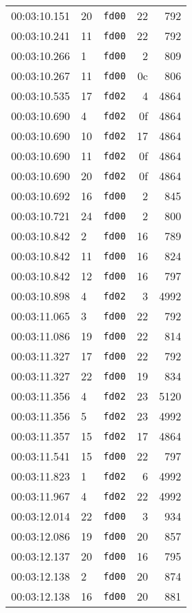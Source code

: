 \documentclass{article}
\begin{document}
\begin{longtable}{lllrr}
00:03:10.151 & 20 & \texttt{fd00} & 22 & 792 \\
00:03:10.241 & 11 & \texttt{fd00} & 22 & 792 \\
00:03:10.266 & 1 & \texttt{fd00} & 2 & 809 \\
00:03:10.267 & 11 & \texttt{fd00} & 0c & 806 \\
00:03:10.535 & 17 & \texttt{fd02} & 4 & 4864 \\
00:03:10.690 & 4 & \texttt{fd02} & 0f & 4864 \\
00:03:10.690 & 10 & \texttt{fd02} & 17 & 4864 \\
00:03:10.690 & 11 & \texttt{fd02} & 0f & 4864 \\
00:03:10.690 & 20 & \texttt{fd02} & 0f & 4864 \\
00:03:10.692 & 16 & \texttt{fd00} & 2 & 845 \\
00:03:10.721 & 24 & \texttt{fd00} & 2 & 800 \\
00:03:10.842 & 2 & \texttt{fd00} & 16 & 789 \\
00:03:10.842 & 11 & \texttt{fd00} & 16 & 824 \\
00:03:10.842 & 12 & \texttt{fd00} & 16 & 797 \\
00:03:10.898 & 4 & \texttt{fd02} & 3 & 4992 \\
00:03:11.065 & 3 & \texttt{fd00} & 22 & 792 \\
00:03:11.086 & 19 & \texttt{fd00} & 22 & 814 \\
00:03:11.327 & 17 & \texttt{fd00} & 22 & 792 \\
00:03:11.327 & 22 & \texttt{fd00} & 19 & 834 \\
00:03:11.356 & 4 & \texttt{fd02} & 23 & 5120 \\
00:03:11.356 & 5 & \texttt{fd02} & 23 & 4992 \\
00:03:11.357 & 15 & \texttt{fd02} & 17 & 4864 \\
00:03:11.541 & 15 & \texttt{fd00} & 22 & 797 \\
00:03:11.823 & 1 & \texttt{fd02} & 6 & 4992 \\
00:03:11.967 & 4 & \texttt{fd02} & 22 & 4992 \\
00:03:12.014 & 22 & \texttt{fd00} & 3 & 934 \\
00:03:12.086 & 19 & \texttt{fd00} & 20 & 857 \\
00:03:12.137 & 20 & \texttt{fd00} & 16 & 795 \\
00:03:12.138 & 2 & \texttt{fd00} & 20 & 874 \\
00:03:12.138 & 16 & \texttt{fd00} & 20 & 881 \\

\end{longtable}
\end{document}
